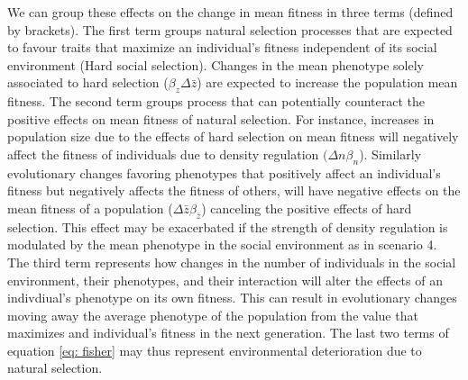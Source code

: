 \documentclass{article}
\begin{document}
We can group these effects on the change in mean fitness in three terms (defined by brackets). The first term groups natural selection processes that are expected to favour traits that maximize an individual's fitness independent of its social environment (Hard social selection). Changes in the mean phenotype solely associated to hard selection ($\beta_{z}\Delta \bar{z}$) are expected to increase the population mean fitness. The second term groups process that can potentially counteract the positive effects on mean fitness of natural selection. For instance, increases in population size due to the effects of hard selection on mean fitness will negatively affect the fitness of individuals due to density regulation $(\Delta n\beta_{n}$). Similarly evolutionary changes favoring phenotypes that positively affect an individual's fitness but negatively affects the fitness of others, will have negative effects on the mean fitness of a population ($\Delta \bar{z} \beta_{\bar{z}}$) canceling the positive effects of hard selection. This effect may be exacerbated if the strength of density regulation is modulated by the mean phenotype in the social environment as in scenario 4. The third term represents how changes in the number of individuals in the social environment, their phenotypes, and their interaction will alter the effects of an indivdiual's phenotype on its own fitness. This can result in evolutionary changes moving away the average phenotype of the population from the value that maximizes and individual's fitness in the next generation. The last two terms of equation \ref{eq: fisher} may thus represent environmental deterioration due to natural selection.
\end{document}
